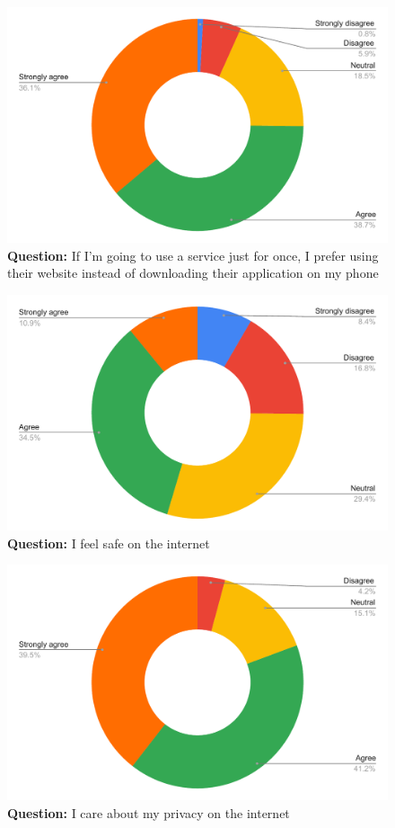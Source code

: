 \begin{figure}[H]
  \centering
  \includegraphics[width=13cm]{thesis/paper/images/p1_q12.pdf}
  \textbf{Question:} If I'm going to use a service just for once, I prefer using their website instead of downloading their application on my phone
\end{figure}

\begin{figure}[H]
  \centering
  \includegraphics[width=13cm]{thesis/paper/images/p1_q13.pdf}
  \textbf{Question:} I feel safe on the internet
\end{figure}

\begin{figure}[H]
  \centering
  \includegraphics[width=13cm]{thesis/paper/images/p1_q14.pdf}
  \textbf{Question:} I care about my privacy on the internet
\end{figure}

